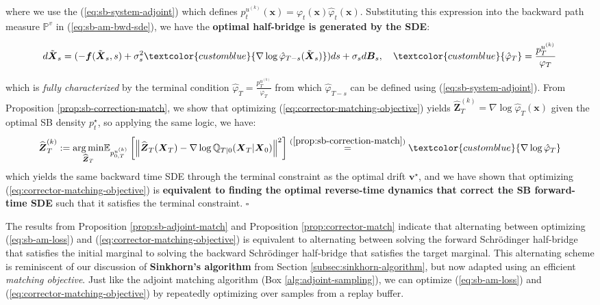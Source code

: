 \documentclass{article}
\newcommand{\bluetext}[1]{\textcolor{customblue}{#1}}
\begin{document}
where we use the (\ref{eq:sb-system-adjoint}) which defines $p^{u^{(k)}}_t(\boldsymbol{x})= \varphi_t(\boldsymbol{x})\hat{\varphi}_t(\boldsymbol{x})$. Substituting this expression into the backward path measure $\mathbb{P}^v$ in (\ref{eq:sb-am-bwd-sde}), we have the \textbf{optimal half-bridge is generated by the SDE}:
\begin{small}
\begin{align}
    d\tilde{\boldsymbol{X}}_s=(-\boldsymbol{f}(\tilde{\boldsymbol{X}}_s,s)+\sigma_s^2\bluetext{\nabla \log \hat{\varphi}_{T-s}(\tilde{\boldsymbol{X}}_s)}) ds+ \sigma_sd\boldsymbol{B}_s, \quad \bluetext{\hat{\varphi}_T}=\frac{p_T^{u^{(k)}}}{\varphi_T}
\end{align}
\end{small}
which is \textit{fully characterized} by the terminal condition $\hat\varphi_T=\frac{p_T^{u^{(k)}}}{\varphi_T}$ from which $\hat{\varphi}_{T-s}$ can be defined using (\ref{eq:sb-system-adjoint}). From Proposition \ref{prop:sb-correction-match}, we show that optimizing (\ref{eq:corrector-matching-objective}) yields $\widehat{\boldsymbol{Z}}^{(k)}_T=\nabla \log \hat\varphi_T(\boldsymbol{x})$ given the optimal SB density $p^\star_t$, so applying the same logic, we have: 
\begin{align}
    \widehat{\boldsymbol{Z}}^{(k)}_T:=\underset{\widehat{\boldsymbol{Z}}_T}{\arg\min}\mathbb{E}_{p^{u^{(k)}}_{0,T}}\left[\left\|\widehat{\boldsymbol{Z}}_T(\boldsymbol{X}_T)-\nabla \log \mathbb{Q}_{T|0}(\boldsymbol{X}_T|\boldsymbol{X}_0)\right\|^2\right]\overset{(\ref{prop:sb-correction-match})}{=}\bluetext{\nabla \log\hat{\varphi}_T}
\end{align}
which yields the same backward time SDE through the terminal constraint as the optimal drift $\boldsymbol{v}^\star$, and we have shown that optimizing (\ref{eq:corrector-matching-objective}) is \textbf{equivalent to finding the optimal reverse-time dynamics that correct the SB forward-time SDE} such that it satisfies the terminal constraint. \hfill $\square$

The results from Proposition \ref{prop:sb-adjoint-match} and Proposition \ref{prop:corrector-match} indicate that alternating between optimizing (\ref{eq:sb-am-loss}) and (\ref{eq:corrector-matching-objective}) is equivalent to alternating between solving the forward Schrödinger half-bridge that satisfies the initial marginal to solving the backward Schrödinger half-bridge that satisfies the target marginal. This alternating scheme is reminiscent of our discussion of \textbf{Sinkhorn's algorithm} from Section \ref{subsec:sinkhorn-algorithm}, but now adapted using an efficient \textit{matching objective}. Just like the adjoint matching algorithm (Box \ref{alg:adjoint-sampling}), we can optimize (\ref{eq:sb-am-loss}) and (\ref{eq:corrector-matching-objective}) by repeatedly optimizing over samples from a replay buffer.
\end{document}
